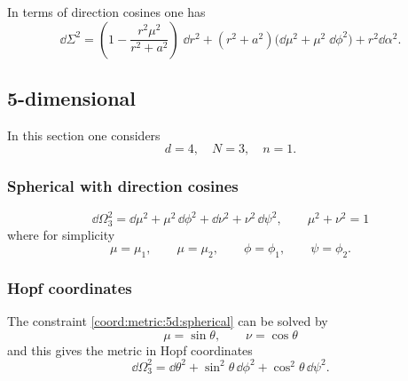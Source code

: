 In terms of direction cosines one has
\begin{equation}
	\dd \Sigma^2 = \left(1 - \frac{r^2 \mu^2}{r^2 + a^2} \right)\; \dd r^2 + (r^2 + a^2) \Big(\dd \mu^2 + \mu^2\; \dd \phi^2 \Big) + r^2 \dd \alpha^2.
\end{equation} 


\subsection{5-dimensional}
\label{app:coord:5d}


In this section one considers
\begin{equation}
	d = 4, \quad
	N = 3, \quad
	n = 1.
\end{equation} 


\subsubsection{Spherical with direction cosines}

\begin{equation}
	\label{coord:metric:5d:spherical}
	\dd\Omega_3^2 = \dd \mu^2 + \mu^2\, \dd\phi^2 + \dd \nu^2 + \nu^2\, \dd\psi^2, \qquad
	\mu^2 + \nu^2 = 1
\end{equation} 
where for simplicity
\begin{equation}
	\mu = \mu_1, \qquad
	\mu = \mu_2, \qquad
	\phi = \phi_1, \qquad
	\psi = \phi_2.
\end{equation} 


\subsubsection{Hopf coordinates}
\label{app:coord:5d:hopf}

The constraint \eqref{coord:metric:5d:spherical} can be solved by
\begin{equation}
	\mu = \sin \theta, \qquad
	\nu = \cos \theta
\end{equation} 
and this gives the metric in Hopf coordinates
\begin{equation}
	\label{coord:metric:5d:hopf}
	\dd \Omega_3^2 = \dd\theta^2 + \sin^2 \theta\, \dd\phi^2 + \cos^2 \theta\, \dd\psi^2.
\end{equation} 
